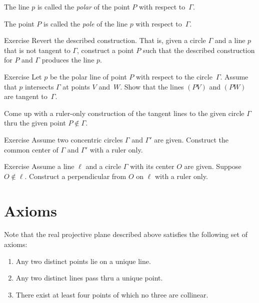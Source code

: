 The line $p$ is called the \emph{polar} of the point $P$ with respect to~$\Gamma$.

The point $P$ is called the \emph{pole} of the line $p$ with respect to~$\Gamma$.

\begin{thm}{Exercise}\label{ex:revert}
Revert the described construction.
That is, given a circle $\Gamma$ and a line $p$ that is not tangent to $\Gamma$, construct a point $P$ such that the described construction for $P$ and $\Gamma$ produces the line $p$.
\end{thm}

\begin{thm}{Exercise}\label{ex:tangent ruler}
Let $p$ be the polar line of point $P$ with respect to the circle~$\Gamma$.
Assume that $p$ intersects $\Gamma$ at points $V$ and~$W$.
Show that the lines $(PV)$ and $(PW)$ are tangent to~$\Gamma$.

Come up with a ruler-only construction of the tangent lines to the given circle $\Gamma$ thru the given point $P\notin\Gamma$.
\end{thm}

\begin{thm}{Exercise}\label{ex:concentric-circ}
Assume two concentric circles $\Gamma$ and $\Gamma'$ are given.
Construct the common center of $\Gamma$ and $\Gamma'$ with a ruler only.
\end{thm}

\begin{thm}{Exercise}\label{ex:proj-perp}
Assume a line $\ell$ and a circle $\Gamma$ with its center $O$ are given.
Suppose $O\notin \ell$.
Construct a perpendicular from $O$ on $\ell$ with a ruler only.
\end{thm}

\section*{Axioms}

Note that the real projective plane described above satisfies the following set of axioms:

\begin{framed}

\begin{enumerate}[p-I.]
\item\label{def:proj-axioms:1} Any two distinct points lie on a unique line.
\item\label{def:proj-axioms:2} Any two distinct lines pass thru a unique point.
\item\label{def:proj-axioms:3} There exist at least four points of which no three are collinear.
\end{enumerate}

\end{framed}


